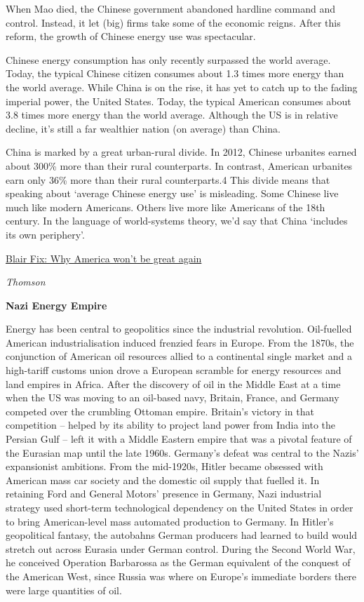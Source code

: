 \documentclass[
]{book}
\begin{document}
When Mao died, the Chinese government abandoned hardline command and control.
Instead, it let (big) firms take some of the economic reigns.
After this reform, the growth of Chinese energy use was spectacular.

Chinese energy consumption has only recently surpassed the world average. Today, the typical Chinese citizen consumes about 1.3 times more energy than the world average. While China is on the rise, it has yet to catch up to the fading imperial power, the United States. Today, the typical American consumes about 3.8 times more energy than the world average. Although the US is in relative decline, it's still a far wealthier nation (on average) than China.

China is marked by a great urban-rural divide. In 2012, Chinese urbanites earned about 300\% more than their rural counterparts. In contrast, American urbanites earn only 36\% more than their rural counterparts.4 This divide means that speaking about `average Chinese energy use' is misleading. Some Chinese live much like modern Americans. Others live more like Americans of the 18th century. In the language of world-systems theory, we'd say that China `includes its own periphery'.

\href{https://economicsfromthetopdown.com/2020/07/11/why-america-wont-be-great-again/}{Blair Fix: Why America won't be great again}

\emph{Thomson}

\textbf{Nazi Energy Empire}

Energy has been central to geopolitics since the industrial revolution. Oil-fuelled American industrialisation induced frenzied fears in Europe. From the 1870s, the conjunction of American oil resources allied to a continental single market and a high-tariff customs union drove a European scramble for energy resources and land empires in Africa. After the discovery of oil in the Middle East at a time when the US was moving to an oil-based navy, Britain, France, and Germany competed over the crumbling Ottoman empire. Britain's victory in that competition -- helped by its ability to project land power from India into the Persian Gulf -- left it with a Middle Eastern empire that was a pivotal feature of the Eurasian map until the late 1960s. Germany's defeat was central to the Nazis' expansionist ambitions. From the mid-1920s, Hitler became obsessed with American mass car society and the domestic oil supply that fuelled it. In retaining Ford and General Motors' presence in Germany, Nazi industrial strategy used short-term technological dependency on the United States in order to bring American-level mass automated production to Germany. In Hitler's geopolitical fantasy, the autobahns German producers had learned to build would stretch out across Eurasia under German control. During the Second World War, he conceived Operation Barbarossa as the German equivalent of the conquest of the American West, since Russia was where on Europe's immediate borders there were large quantities of oil.
\end{document}

